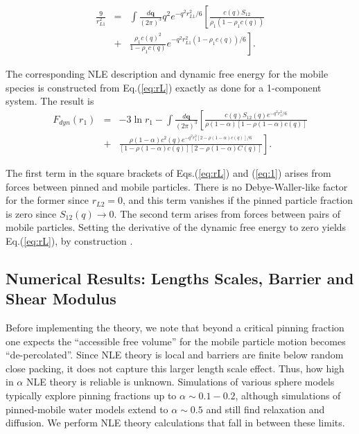 \documentclass[twocolumn,showpacs,preprintnumbers,amsmath,amssymb,unsortedaddress,
]{revtex4-1}
\begin{document}
\begin{eqnarray}
\frac{9}{r^2_{L1}}&=&\int \frac{d\mathbf{q}}{(2\pi)^3}q^2e^{-q^2r_{L1}^2/6}\left[\frac{c(q)S_{12}}{\rho_1\left(1-\rho_1c(q) \right)}\right. \nonumber\\
&+&\left.  \frac{\rho_1 c(q)^2}{1-\rho_1c(q)}e^{-q^2r_{L1}^2(1-\rho_1c(q))/6} \right].
\label{eq:rL}
\end{eqnarray}

The corresponding NLE description and dynamic free energy for the mobile species is constructed from Eq.(\ref{eq:rL}) exactly as done for a 1-component system. The result is
\begin{eqnarray}
F_{dyn}(r_1) &=& -3\ln r_1 - \int \frac{d\mathbf{q}}{(2\pi)^3}\left[\frac{c(q)S_{12}(q)e^{-q^2r_1^2/6}}{\rho(1-\alpha)\left[1-\rho(1-\alpha) c(q) \right]} \right.\nonumber\\
& +&\left.\frac{\rho(1-\alpha)c^2(q)e^{-q^2r_1^2\left[2-\rho(1-\alpha)c(q)\right]/6}}{\left[1-\rho(1-\alpha)c(q)\right] \left[2- \rho(1-\alpha)C(q)\right]} \right].
\label{eq:1}
\end{eqnarray}

The first term in the square brackets of Eqs.(\ref{eq:rL}) and (\ref{eq:1}) arises from forces between pinned and mobile particles. There is no Debye-Waller-like factor for the former since $r_{L2}=0$, and this term vanishes if the pinned particle fraction is zero since $S_{12}(q)\rightarrow 0$. The second term arises from forces between pairs of mobile particles. Setting the derivative of the dynamic free energy to zero yields Eq.(\ref{eq:rL}), by construction \cite{34}.
\subsection{Numerical Results: Lengths Scales, Barrier and Shear Modulus}
Before implementing the theory, we note that beyond a critical pinning fraction one expects the “accessible free volume” for the mobile particle motion becomes “de-percolated”. Since NLE theory is local and barriers are finite below random close packing, it does not capture this larger length scale effect. Thus, how high in $\alpha$ NLE theory is reliable is unknown. Simulations of various sphere models \cite{23,24,25,26,27,28} typically explore pinning fractions up to $\alpha\sim 0.1-0.2$, although simulations of pinned-mobile water models \cite{44} extend to $\alpha\sim 0.5$ and still find relaxation and diffusion. We perform NLE theory calculations that fall in between these limits.
\end{document}
